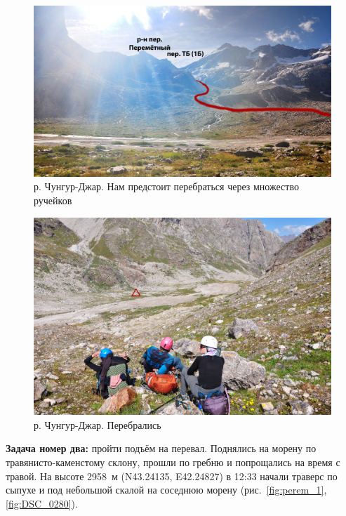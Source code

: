 \begin{figure}[h!]
	\centering
	\includegraphics[width=0.7\linewidth]{../pics/DSC_0254.jpg}
	\caption{р. Чунгур-Джар. Нам предстоит перебраться через множество ручейков}
	\label{fig:DSC_0254}
\end{figure}

\begin{figure}[h!]
	\centering
	\includegraphics[width=0.7\linewidth]{../pics/DSC_0277.jpg}
	\caption{р. Чунгур-Джар. Перебрались}
	\label{fig:DSC_0277}
\end{figure}


\textbf{Задача номер два:} пройти подъём на перевал. Поднялись на морену по травянисто-каменстому склону, прошли по гребню и попрощались на время с травой. На высоте 2958~м (N43.24135\degree, E42.24827\degree) в 12:33  начали траверс по сыпухе и под небольшой скалой на соседнюю морену (рис.~\ref{fig:perem_1},\ref{fig:DSC_0280}).

